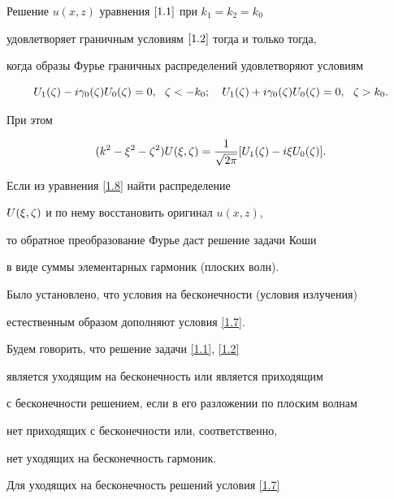 \begin{thm}


Решение $u(x,z)$ уравнения $\eqref{1.1}$ при $k_1=k_2=k_0$


удовлетворяет граничным условиям $\eqref{1.2}$ тогда и только тогда,


когда образы Фурье граничных распределений удовлетворяют условиям


\begin{equation}\label{1.7}


U_1(\dz)-i\gazdz U_0(\dz) = 0,\ \ \dz<-k_0 ;\quad


U_1(\dz)+i\gazdz U_0(\dz) = 0,\ \ \dz>k_0 .


\end{equation}


При этом


\begin{equation}\label{1.8}


(k^2-\xi^2-\dz^2)U(\xi,\dz)=\frac{1}{\sqrt{2\pi}}


[U_1(\dz)-i\xi U_0(\dz)] .


\end{equation}


\end{thm}





Если из уравнения \eqref{1.8} найти распределение


$U(\xi,\zeta)$ и по нему восстановить оригинал $u(x,z)$,


то обратное преобразование Фурье даст решение задачи Коши


в виде суммы элементарных гармоник (плоских волн).


Было установлено, что условия на бесконечности (условия излучения)


естественным образом дополняют условия \eqref{1.7}.





Будем говорить, что решение задачи \eqref{1.1}, \eqref{1.2}


является уходящим на бесконечность или является приходящим


с бесконечности решением, если в его разложении по плоским волнам


нет приходящих с бесконечности или, соответственно,


нет уходящих на бесконечность гармоник.


Для уходящих на бесконечность решений условия \eqref{1.7}


